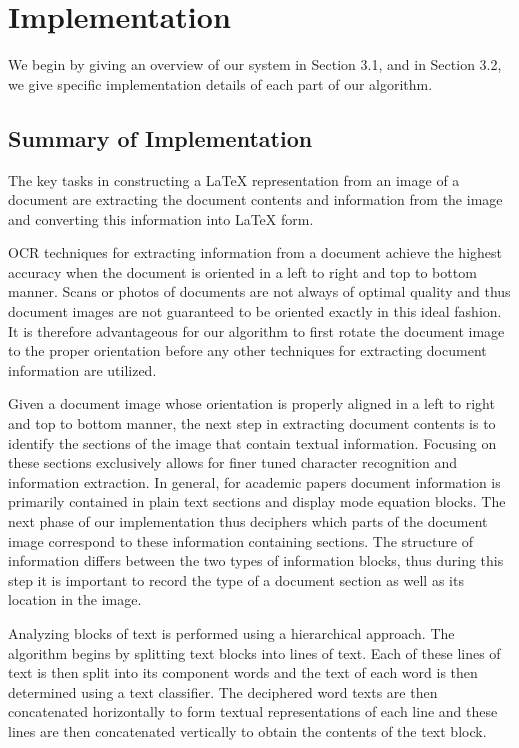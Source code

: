 \documentclass[12pt]{IEEEtran}
\newcommand{\latex}{\LaTeX\xspace}
\begin{document}
\section{Implementation}

We begin by giving an overview of our system in Section 3.1, and in Section 3.2, we give specific implementation details of each part of our algorithm.

\subsection{Summary of Implementation}
The key tasks in constructing a \latex representation from an image of a document are extracting the document contents and information from the image and converting this information into \latex form.

OCR techniques for extracting information from a document achieve the highest accuracy when the document is oriented in a left to right and top to bottom manner. Scans or photos of documents are not always of optimal quality and thus document images are not guaranteed to be oriented exactly in this ideal fashion. It is therefore advantageous for our algorithm to first rotate the document image to the proper orientation before any other techniques for extracting document information are utilized.

Given a document image whose orientation is properly aligned in a left to right and top to bottom manner, the next step in extracting document contents is to identify the sections of the image that contain textual information. Focusing on these sections exclusively allows for finer tuned character recognition and information extraction. In general, for academic papers document information is primarily contained in plain text sections and display mode equation blocks. The next phase of our implementation thus deciphers which parts of the document image correspond to these information containing sections. The structure of information differs between the two types of information blocks, thus during this step it is important to record the type of a document section as well as its location in the image.

Analyzing blocks of text is performed using a hierarchical approach. The algorithm begins by splitting text blocks into lines of text. Each of these lines of text is then split into its component words and the text of each word is then determined using a text classifier. The deciphered word texts are then concatenated horizontally to form textual representations of each line and these lines are then concatenated vertically to obtain the contents of the text block.
\end{document}
